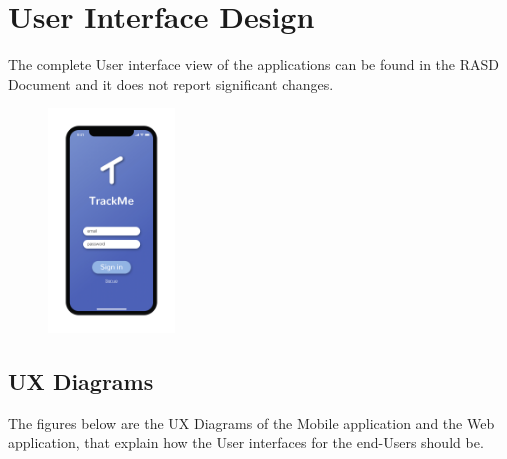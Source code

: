 \chapter{User Interface Design}
The complete User interface view of the applications can be found in the RASD Document and it does not report significant changes.

\begin{figure}[H]

    \centering
   
\end{figure}

\begin{figure}[H]

    \centering
    \includegraphics[width=0.30\textwidth]{./Pictures/Mockup/mobile/login.png}
    
\end{figure}

\section{UX Diagrams}
The figures below are the UX Diagrams of the Mobile application and the Web application, that explain how the User interfaces for the end-Users should be.

